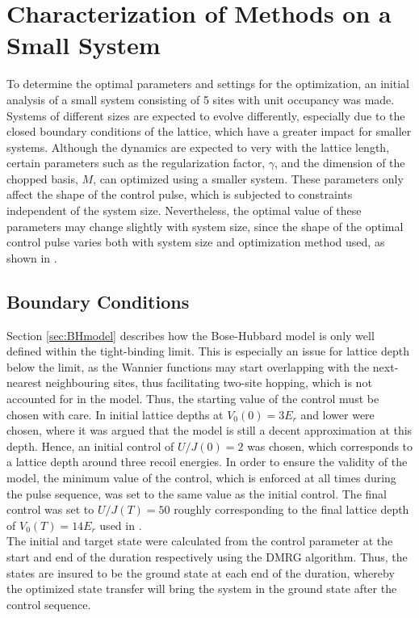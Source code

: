 \section{Characterization of Methods on a Small System} \label{sec:5partOptimization}
To determine the optimal parameters and settings for the optimization, an initial analysis of a small system consisting of 5 sites with unit occupancy was made. Systems of different sizes are expected to evolve differently, especially due to the closed boundary conditions of the lattice, which have a greater impact for smaller systems. Although the dynamics are expected to very with the lattice length, certain parameters such as the regularization factor, $\gamma$, and the dimension of the chopped basis, $M$, can optimized using a smaller system. These parameters only affect the shape of the control pulse, which is subjected to constraints independent of the system size. Nevertheless, the optimal value of these parameters may change slightly with system size, since the shape of the optimal control pulse varies both with system size and optimization method used, as shown in \cite{MajaJulie}. 


\subsection{Boundary Conditions}
Section \ref{sec:BHmodel} describes how the Bose-Hubbard model is only well defined within the tight-binding limit. This is especially an issue for lattice depth below the limit, as the Wannier functions may start overlapping with the next-nearest neighbouring sites, thus facilitating two-site hopping, which is not accounted for in the model. Thus, the starting value of the control must be chosen with care. In \cite{FrankBloch,Doria2011} initial lattice depths at $V_0 (0) = 3 E_r$ and lower were chosen, where it was argued that the model is still a decent approximation at this depth. Hence, an initial control of $U/J (0) = 2$ was chosen, which corresponds to a lattice depth around three recoil energies. In order to ensure the validity of the model, the minimum value of the control, which is enforced at all times during the pulse sequence, was set to the same value as the initial control.  
The final control was set to $U/J (T) = 50$ roughly corresponding to the final lattice depth of $V_0 (T) = 14 E_r$ used in \cite{FrankBloch}.\\
The initial and target state were calculated from the control parameter at the start and end of the duration respectively using the DMRG algorithm. Thus, the states are insured to be the ground state at each end of the duration, whereby the optimized state transfer will bring the system in the ground state after the control sequence.


